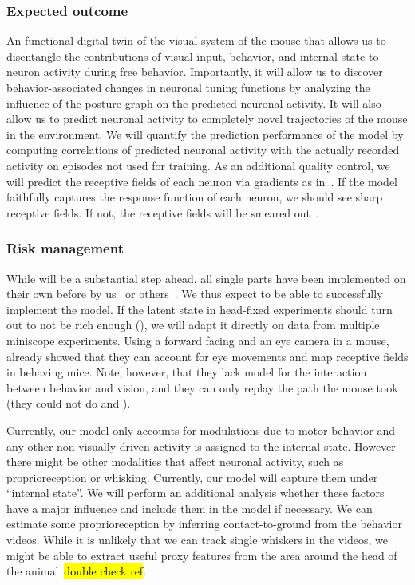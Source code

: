 \documentclass[B2,COG]{ercgrant}
\begin{document}
\subsubsection{Expected outcome} 

An functional digital twin of the visual system of the mouse that allows us to disentangle the contributions of visual input, behavior, and internal state to neuron activity during free behavior. 
Importantly, it will allow us to discover behavior-associated changes in neuronal tuning functions by analyzing the influence of the posture graph on the predicted neuronal activity.
It will also allow us to predict neuronal activity to completely novel trajectories of the mouse in the environment.
We will quantify the prediction performance of the model by computing correlations of predicted neuronal activity with the actually recorded activity on episodes not used for training. 
As an additional quality control, we will predict the receptive fields of each neuron via gradients as in~\textcite{Sinz2018-sk}. 
If the model faithfully captures the response function of each neuron, we should see sharp receptive fields.
If not, the receptive fields will be smeared out~\parencite{Parker2022-ac}.

\subsubsection{Risk management} 
While  will be a substantial step ahead, all single parts have been implemented on their own before by us~\parencite{Sinz2018-sk, Bashiri2021-or} or others~\parencite{Parker2022-ac,Holmgren2021-jv}. 
We thus expect to be able to successfully implement the model. 
If the latent state in head-fixed experiments should turn out to not be rich enough (), we will adapt it directly on data from multiple miniscope experiments. 
Using a forward facing and an eye camera in a mouse, \textcite{Parker2022-ac} already showed that they can account for eye movements and map receptive fields in behaving mice. Note, however, that they lack model for the interaction between behavior and vision, and they can only replay the path the mouse took (they could not do  and ).

Currently, our model only accounts for modulations due to motor behavior and any other non-visually driven activity is assigned to the internal state. 
However there might be other modalities that affect neuronal activity, such as proprioreception or whisking. 
Currently, our model will capture them under ``internal state''.
We will perform an additional analysis whether these factors have a major influence and include them in the model if necessary. 
We can estimate some proprioreception by inferring contact-to-ground from the behavior videos.
While it is unlikely that we can track single whiskers in the videos, we might be able to extract useful proxy features from the area around the head of the animal~\parencite{Syeda2022-bk}\hl{double check ref}.
\end{document}

